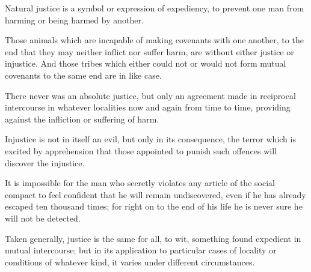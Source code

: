 \documentclass{stex}
\begin{document}
\vspace{0.5em}
\begin{sparagraph}[title=31]
  Natural justice is a symbol or expression of expediency, to prevent one man from harming or being harmed by another.
\end{sparagraph}

\vspace{0.5em}
\begin{sparagraph}[title=32]
  Those animals which are incapable of making covenants with one another, to the end that they may neither inflict nor suffer harm, are without either justice or injustice.
  And those tribes which either could not or would not form mutual covenants to the same end are in like case.
\end{sparagraph}

\vspace{0.5em}
\begin{sparagraph}[title=33]
  There never was an absolute justice, but only an agreement made in reciprocal intercourse in whatever localities now and again from time to time, providing against the infliction or suffering of harm.
\end{sparagraph}

\vspace{0.5em}
\begin{sparagraph}[title=34]
  Injustice is not in itself an evil, but only in its consequence, \videlicet the terror which is excited by apprehension that those appointed to punish such offences will discover the injustice.
\end{sparagraph}

\vspace{0.5em}
\begin{sparagraph}[title=35]
  It is impossible for the man who secretly violates any article of the social compact to feel confident that he will remain undiscovered, even if he has already escaped ten thousand times; for right on to the end of his life he is never sure he will not be detected.
\end{sparagraph}

\vspace{0.5em}
\begin{sparagraph}[title=36]
  Taken generally, justice is the same for all, to wit, something found expedient in mutual intercourse; but in its application to particular cases of locality or conditions of whatever kind, it varies under different circumstances.
\end{sparagraph}
\end{document}
